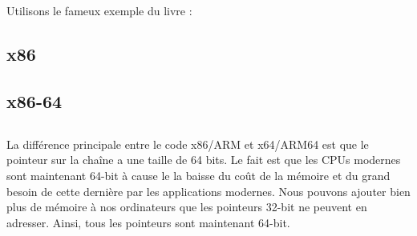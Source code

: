 \section{\HelloWorldSectionName}
\label{sec:helloworld}

Utilisons le fameux exemple du livre \KRBook:



\subsection{x86}





\subsection{x86-64}








\subsection{\Conclusion{}}

La différence principale entre le code x86/ARM et x64/ARM64 est que le pointeur sur la chaîne a une taille de 64 bits.
Le fait est que les \ac{CPU}s modernes sont maintenant 64-bit à cause le la baisse du coût de la mémoire et du grand
besoin de cette dernière par les applications modernes.
Nous pouvons ajouter bien plus de mémoire à nos ordinateurs que les pointeurs 32-bit ne peuvent en adresser.
Ainsi, tous les pointeurs sont maintenant 64-bit.



